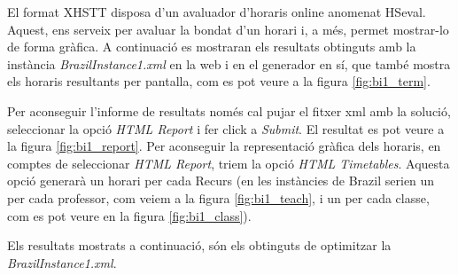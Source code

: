 \documentclass[11pt,a4paper,twoside]{report}
\begin{document}
  El format XHSTT disposa d'un avaluador d'horaris online anomenat HSeval\cite{hseval}. Aquest, ens serveix per avaluar la bondat d'un horari i, a més, permet mostrar-lo de forma gràfica. 
  A continuació es mostraran els resultats obtinguts amb la instància \textit{BrazilInstance1.xml} en la web i en el generador en sí, que també mostra els horaris resultants per pantalla, com es pot veure a la figura \ref{fig:bi1_term}. 

  Per aconseguir l'informe de resultats només cal pujar el fitxer xml amb la solució, seleccionar la opció \textit{HTML Report} i fer click a \textit{Submit}. El resultat es pot veure a la figura \ref{fig:bi1_report}.
  Per aconseguir la representació gràfica dels horaris, en comptes de seleccionar \textit{HTML Report}, triem la opció \textit{HTML Timetables}. 
  Aquesta opció generarà un horari per cada Recurs (en les instàncies de Brazil serien un per cada professor, com veiem a la figura \ref{fig:bi1_teach}, i un per cada classe, com es pot veure en la figura \ref{fig:bi1_class}). 

  Els resultats mostrats a continuació, són els obtinguts de optimitzar la \textit{BrazilInstance1.xml}. \newpage
\end{document}

